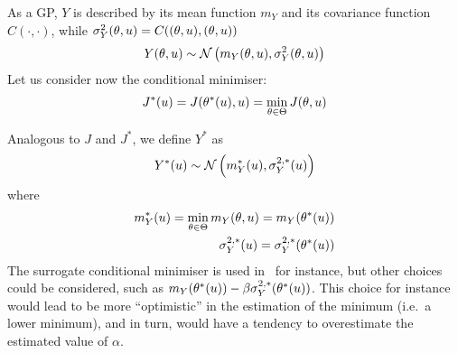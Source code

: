 \documentclass[../../Main_ManuscritThese.tex]{subfiles}
\begin{document}
As a GP, $Y$ is described by its mean function $m_{Y}$ and its covariance function $C(\cdot, \cdot)$, while $\sigma^2_Y(\theta,u) = C((\theta,u), (\theta,u))$
\begin{equation}
  Y(\theta,u) \sim \mathcal{N}\left(m_{Y}(\theta,u), \sigma^2_Y(\theta,u) \right)
\end{equation}
Let us consider now the conditional minimiser:
\begin{align}
  J^*(u) = J(\theta^*(u),u) = \min_{\theta\in\Theta} J(\theta,u)
\end{align}

Analogous to $J$ and $J^*$, we define $Y^*$ as
\begin{equation}
  Y^*(u) \sim \mathcal{N}\left(m^*_Y(u), \sigma^{2,*}_Y(u)\right)
\end{equation}
where
\begin{align}
  m^*_Y(u) = \min_{\theta\in\Theta} m_Y(\theta,u) = m_Y(\theta^*(u)) \\
  \sigma^{2,*}_Y(u) = \sigma^{2,*}_Y(\theta^*(u)) 
\end{align}
The surrogate conditional minimiser is used in~\cite{ginsbourger_bayesian_2014} for instance, but other choices could be considered, such as $m_Y(\theta^*(u)) - \beta \sigma^{2,*}_Y(\theta^*(u))$. This choice for instance would lead to be more ``optimistic'' in the estimation of the minimum (i.e.\ a lower minimum), and in turn, would have a tendency to overestimate the estimated value of $\alpha$.
\end{document}
